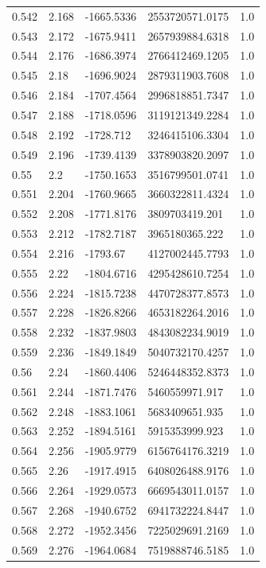 \begin{tabular}{lllll}
0.542 & 2.168 & -1665.5336 & 2553720571.0175 & 1.0 \\
0.543 & 2.172 & -1675.9411 & 2657939884.6318 & 1.0 \\
0.544 & 2.176 & -1686.3974 & 2766412469.1205 & 1.0 \\
0.545 & 2.18 & -1696.9024 & 2879311903.7608 & 1.0 \\
0.546 & 2.184 & -1707.4564 & 2996818851.7347 & 1.0 \\
0.547 & 2.188 & -1718.0596 & 3119121349.2284 & 1.0 \\
0.548 & 2.192 & -1728.712 & 3246415106.3304 & 1.0 \\
0.549 & 2.196 & -1739.4139 & 3378903820.2097 & 1.0 \\
0.55 & 2.2 & -1750.1653 & 3516799501.0741 & 1.0 \\
0.551 & 2.204 & -1760.9665 & 3660322811.4324 & 1.0 \\
0.552 & 2.208 & -1771.8176 & 3809703419.201 & 1.0 \\
0.553 & 2.212 & -1782.7187 & 3965180365.222 & 1.0 \\
0.554 & 2.216 & -1793.67 & 4127002445.7793 & 1.0 \\
0.555 & 2.22 & -1804.6716 & 4295428610.7254 & 1.0 \\
0.556 & 2.224 & -1815.7238 & 4470728377.8573 & 1.0 \\
0.557 & 2.228 & -1826.8266 & 4653182264.2016 & 1.0 \\
0.558 & 2.232 & -1837.9803 & 4843082234.9019 & 1.0 \\
0.559 & 2.236 & -1849.1849 & 5040732170.4257 & 1.0 \\
0.56 & 2.24 & -1860.4406 & 5246448352.8373 & 1.0 \\
0.561 & 2.244 & -1871.7476 & 5460559971.917 & 1.0 \\
0.562 & 2.248 & -1883.1061 & 5683409651.935 & 1.0 \\
0.563 & 2.252 & -1894.5161 & 5915353999.923 & 1.0 \\
0.564 & 2.256 & -1905.9779 & 6156764176.3219 & 1.0 \\
0.565 & 2.26 & -1917.4915 & 6408026488.9176 & 1.0 \\
0.566 & 2.264 & -1929.0573 & 6669543011.0157 & 1.0 \\
0.567 & 2.268 & -1940.6752 & 6941732224.8447 & 1.0 \\
0.568 & 2.272 & -1952.3456 & 7225029691.2169 & 1.0 \\
0.569 & 2.276 & -1964.0684 & 7519888746.5185 & 1.0 \\

\end{tabular}
